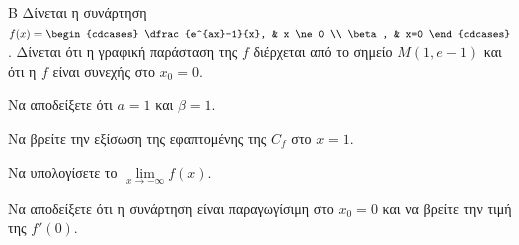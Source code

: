 \begin{thema}{Β}
Δίνεται η συνάρτηση $f(x) = \begin{cdcases} \dfrac{e^{ax}-1}{x}, & x \ne 0 \\ \beta, & x=0 \end{cdcases}$. Δίνεται ότι η γραφική παράσταση της $f$ διέρχεται από το σημείο $M(1, e-1)$ και ότι η $f$ είναι συνεχής στο $x_0 = 0$.
\begin{erwthma}
  \item Να αποδείξετε ότι $a=1$ και $\beta=1$.
  \item Να βρείτε την εξίσωση της εφαπτομένης της $C_f$ στο $x=1$.
  \item Να υπολογίσετε το $\lim\limits_{x \to -\infty} f(x)$.
  \item Να αποδείξετε ότι η συνάρτηση είναι παραγωγίσιμη στο $x_0 = 0$ και να βρείτε την τιμή της $f'(0)$.
\end{erwthma}
\end{thema}

